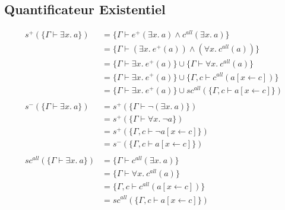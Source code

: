 \documentclass[12pt]{article}
\begin{document}
\subsection*{Quantificateur Existentiel}
\begin{align*}
  s^+ (\{\Gamma \vdash \exists x.~ a\})      & = \{\Gamma \vdash e^+(\exists x.~ a) \land c^{all} (\exists x.~ a)\}                        \\
                                             & = \{\Gamma \vdash (\exists x.~ e^+(a)) \land (\forall x.~ c^{all} (a) )\}                   \\
                                             & = \{\Gamma \vdash \exists x.~ e^+(a)\} \cup \{\Gamma \vdash \forall x.~ c^{all} (a)\}       \\
                                             & = \{\Gamma \vdash \exists x.~ e^+(a)\} \cup \{\Gamma, c \vdash c^{all} (a[x\leftarrow c])\} \\
                                             & = \{\Gamma \vdash \exists x.~ e^+(a)\} \cup sc^{all}(\{\Gamma, c \vdash a[x\leftarrow c]\}) \\
  \\
  s^- (\{\Gamma \vdash \exists x.~ a\})      & = s^+ (\{\Gamma \vdash \neg(\exists x.~ a)\})                                               \\
                                             & = s^+ (\{\Gamma \vdash \forall x.~ \neg a\})                                                \\
                                             & = s^+ (\{\Gamma, c \vdash \neg a[x\leftarrow c]\})                                          \\
                                             & = s^- (\{\Gamma, c \vdash a[x\leftarrow c]\})                                               \\
  \\
  sc^{all} (\{\Gamma \vdash \exists x.~ a\}) & = \{\Gamma \vdash c^{all}(\exists x.~ a)\}                                                  \\
                                             & = \{\Gamma \vdash \forall x.~ c^{all}(a)\}                                                  \\
                                             & = \{\Gamma, c\vdash c^{all}(a[x\leftarrow c])\}                                             \\
                                             & = sc^{all} (\{\Gamma, c\vdash a[x\leftarrow c]\})
\end{align*}
\end{document}
